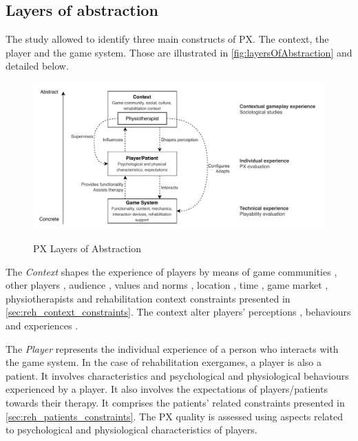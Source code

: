 \subsection{Layers of abstraction}
\label{sec:layers_abstraction}
The study allowed to identify three main constructs of \ac{PX}. The context, the player and the game system. Those are illustrated in \autoref{fig:layersOfAbstraction} and detailed below.

\begin{figure}[bth]
\myfloatalign
{\includegraphics[width=\linewidth]{gfx/model/layersOfAbstraction}} \quad
\caption{\ac{PX} Layers of Abstraction}\label{fig:layersOfAbstraction}
\end{figure}

The \textit{Context} shapes the experience of players by means of game communities \autocite{Nacked,Nackea2,Elson2014}, other players \autocite{Nacked,Nackea2,Nackea,DeKort2007b,Elson2014}, audience \autocite{DeKort2007b,Mayra,Nackea2}, values and norms \autocite{Elson2014,Mayra}, location \autocite{Engl2013,Elson2014}, time \autocite{Engl2013}, game market \autocite{Elson2014,Nackea}, physiotherapists and rehabilitation context constraints presented in \autoref{sec:reh_context_constraints}. The context alter players' perceptions \autocite{Nackea2,Nackea}, behaviours and experiences \autocite{Engl2013}.

The \textit{Player} represents the individual experience of a person who interacts with the game system. In the case of rehabilitation exergames, a player is also a patient. It involves characteristics \autocite{Elson2014,Fernandez2008,Mayra} and psychological \autocite{Elson2014} and physiological behaviours experienced by a player. It also involves the expectations of players/patients towards their therapy. It comprises the patients' related constraints presented in \autoref{sec:reh_patients_constraints}. The \ac{PX} quality is assessed using aspects related to psychological and physiological characteristics of players.

